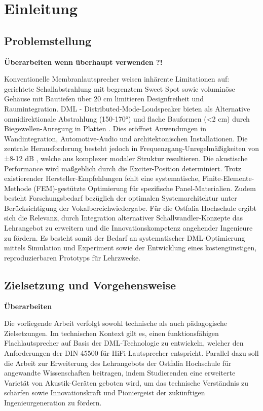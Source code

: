 \chapter{Einleitung}


\section{Problemstellung}

\textbf{Überarbeiten wenn überhaupt verwenden ?!}

Konventionelle Membranlautsprecher weisen inhärente Limitationen auf: gerichtete Schallabstrahlung mit begrenztem Sweet Spot sowie voluminöse Gehäuse mit Bautiefen über 20 cm limitieren Designfreiheit und Raumintegration.
DML - Distributed-Mode-Loudspeaker bieten als Alternative omnidirektionale Abstrahlung (150-170°) und flache Bauformen (<2 cm) durch Biegewellen-Anregung in Platten \cite{Harris2000}. Dies eröffnet Anwendungen in Wandintegration, Automotive-Audio und architektonischen Installationen. Die zentrale Herausforderung besteht jedoch in Frequenzgang-Unregelmäßigkeiten von ±8-12 dB \cite{Bai2001}, welche aus komplexer modaler Struktur resultieren. Die akustische Performance wird maßgeblich durch die Exciter-Position determiniert.
Trotz existierender Hersteller-Empfehlungen fehlt eine systematische, Finite-Elemente-Methode (FEM)-gestützte Optimierung für spezifische Panel-Materialien. Zudem besteht Forschungsbedarf bezüglich der optimalen Systemarchitektur unter Berücksichtigung der Vokalbereichwiedergabe.
Für die Ostfalia Hochschule ergibt sich die Relevanz, durch Integration alternativer Schallwandler-Konzepte das Lehrangebot zu erweitern und die Innovationskompetenz angehender Ingenieure zu fördern. Es besteht somit der Bedarf an systematischer DML-Optimierung mittels Simulation und Experiment sowie der Entwicklung eines kostengünstigen, reproduzierbaren Prototyps für Lehrzwecke.


\section{Zielsetzung und Vorgehensweise}

\textbf{Überarbeiten}

Die vorliegende Arbeit verfolgt sowohl technische als auch pädagogische Zielsetzungen. Im technischen Kontext gilt es, einen funktionsfähigen Flachlautsprecher auf Basis der DML-Technologie zu entwickeln, welcher den Anforderungen der DIN 45500 für HiFi-Lautsprecher entspricht. Parallel dazu soll die Arbeit zur Erweiterung des Lehrangebots der Ostfalia Hochschule für angewandte Wissenschaften beitragen, indem Studierenden eine erweiterte Varietät von Akustik-Geräten geboten wird, um das technische Verständnis zu schärfen sowie Innovationskraft und Pioniergeist der zukünftigen Ingenieurgeneration zu fördern.

